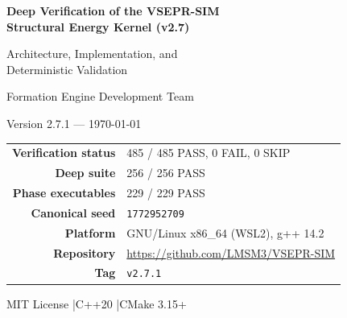 \documentclass[11pt,twoside]{article}
\begin{document}
\begin{titlepage}
\centering
\vspace*{2cm}

{\Huge\bfseries Deep Verification of the VSEPR-SIM\\
Structural Energy Kernel (v2.7)\par}

\vspace{0.8cm}
{\Large Architecture, Implementation, and\\
Deterministic Validation\par}

\vspace{2cm}

{\large Formation Engine Development Team\par}

\vspace{1cm}

{\large Version 2.7.1 --- \today\par}

\vspace{2cm}

\begin{minipage}{0.8\textwidth}
\begin{center}
\begin{tabular}{rl}
\toprule
\textbf{Verification status} & 485 / 485 PASS, 0 FAIL, 0 SKIP \\
\textbf{Deep suite}          & 256 / 256 PASS \\
\textbf{Phase executables}   & 229 / 229 PASS \\
\textbf{Canonical seed}      & \texttt{1772952709} \\
\textbf{Platform}            & GNU/Linux x86\_64 (WSL2), g++ 14.2 \\
\textbf{Repository}          & \url{https://github.com/LMSM3/VSEPR-SIM} \\
\textbf{Tag}                 & \texttt{v2.7.1} \\
\bottomrule
\end{tabular}
\end{center}
\end{minipage}

\vfill
{\small MIT License \quad|\quad C++20 \quad|\quad CMake 3.15+}
\end{titlepage}

\tableofcontents
\newpage

\end{document}
